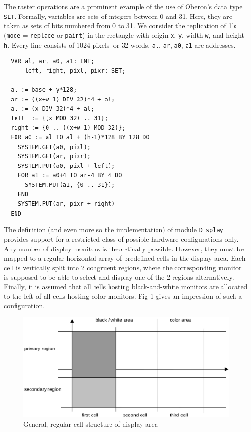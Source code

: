 The raster operations are a prominent example of the use of Oberon's data type \verb|SET|.
Formally, variables are sets of integers between 0 and 31.
Here, they are taken as sets of bits numbered from 0 to 31.
We consider the replication of 1's (\verb|mode| = \verb|replace| or \verb|paint|)
in the rectangle with origin \verb|x|, \verb|y|, width \verb|w|, and height \verb|h|.
Every line consists of 1024 pixels, or 32 words.
\verb|al|, \verb|ar|, \verb|a0|, \verb|a1| are addresses.
\begin{verbatim}
  VAR al, ar, a0, a1: INT;
      left, right, pixl, pixr: SET;
  
  al := base + y*128;
  ar := ((x+w-1) DIV 32)*4 + al;
  al := (x DIV 32)*4 + al;
  left  := {(x MOD 32) .. 31};
  right := {0 .. ((x+w-1) MOD 32)};
  FOR a0 := al TO al + (h-1)*128 BY 128 DO
    SYSTEM.GET(a0, pixl);
    SYSTEM.GET(ar, pixr);
    SYSTEM.PUT(a0, pixl + left);
    FOR a1 := a0+4 TO ar-4 BY 4 DO
      SYSTEM.PUT(a1, {0 .. 31});
    END
    SYSTEM.PUT(ar, pixr + right)
  END
\end{verbatim}
The definition (and even more so the implementation) of module \verb|Display| provides support
for a restricted class of possible hardware configurations only. Any number of display monitors
is theoretically possible. However, they must be mapped to a regular horizontal array
of predefined cells in the display area. Each cell is vertically split into 2 congruent regions,
where the corresponding monitor is supposed to be able to select and display one of the 2 regions
alternatively. Finally, it is assumed that all cells hosting black-and-white monitors
are allocated to the left of all cells hosting color monitors.
Fig \ref{fig:cell} gives an impression of such a configuration.
\begin{figure}[h!]
  \centering
  \includegraphics[width=\textwidth]{i/c}
  \caption{General, regular cell structure of display area}
  \label{fig:cell}
\end{figure}

